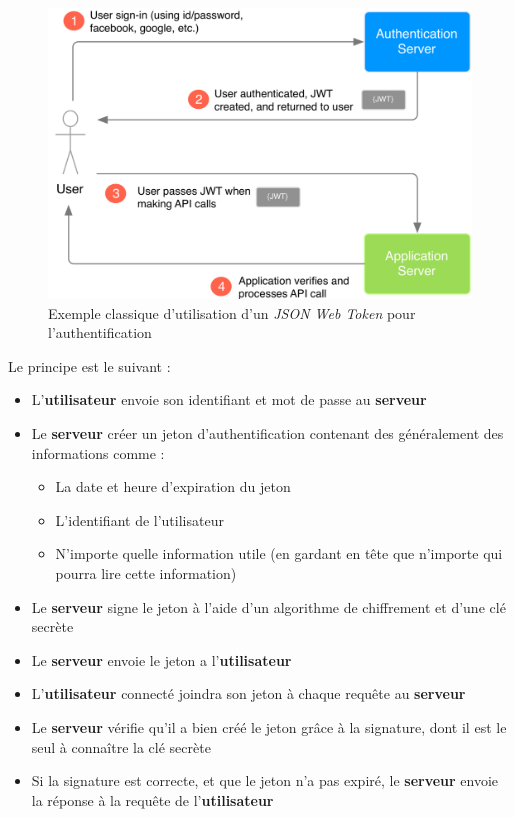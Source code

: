   \begin{figure}[H]
    \centering
    \includegraphics[width=1\linewidth]{img/jwt.png}
    \caption{Exemple classique d'utilisation d'un \textit{JSON Web Token} pour l'authentification}
  \end{figure}

Le principe est le suivant :

\newcommand{\user}{\textbf{utilisateur}\xspace}
\newcommand{\server}{\textbf{serveur}\xspace}

\begin{itemize}
    \item L'\user envoie son identifiant et mot de passe au \server
    \item Le \server créer un jeton d'authentification contenant des généralement des informations comme :
    \begin{itemize}
        \item La date et heure d'expiration du jeton
        \item L'identifiant de l'utilisateur
        \item N'importe quelle information utile (en gardant en tête que n'importe qui pourra lire cette information)
    \end{itemize}
    \item Le \server signe le jeton à l'aide d'un algorithme de chiffrement et d'une clé secrète
    \item Le \server envoie le jeton a l'\user
    \item L'\user connecté joindra son jeton à chaque requête au \server
    \item Le \server vérifie qu'il a bien créé le jeton grâce à la signature, dont il est le seul à connaître la clé secrète
    \item Si la signature est correcte, et que le jeton n'a pas expiré, le \server envoie la réponse à la requête de l'\user
\end{itemize}


